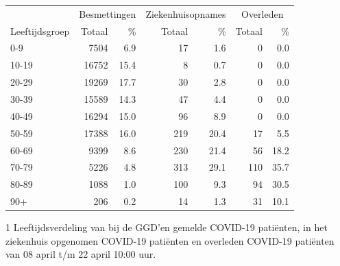 \documentclass[
  english,
  man,floatsintext]{apa6}
\begin{document}
\begin{table}
\centering\begingroup\fontsize{11}{13}\selectfont

\begin{threeparttable}
\begin{tabular}{lrrrrrr}
\toprule
\multicolumn{1}{c}{ } & \multicolumn{2}{c}{Besmettingen} & \multicolumn{2}{c}{Ziekenhuisopnames} & \multicolumn{2}{c}{Overleden} \\
\cmidrule(l{3pt}r{3pt}){2-3} \cmidrule(l{3pt}r{3pt}){4-5} \cmidrule(l{3pt}r{3pt}){6-7}
Leeftijdsgroep & Totaal & \% & Totaal & \% & Totaal & \%\\
\midrule
0-9 & 7504 & 6.9 & 17 & 1.6 & 0 & 0.0\\
10-19 & 16752 & 15.4 & 8 & 0.7 & 0 & 0.0\\
20-29 & 19269 & 17.7 & 30 & 2.8 & 0 & 0.0\\
30-39 & 15589 & 14.3 & 47 & 4.4 & 0 & 0.0\\
40-49 & 16294 & 15.0 & 96 & 8.9 & 0 & 0.0\\
50-59 & 17388 & 16.0 & 219 & 20.4 & 17 & 5.5\\
60-69 & 9399 & 8.6 & 230 & 21.4 & 56 & 18.2\\
70-79 & 5226 & 4.8 & 313 & 29.1 & 110 & 35.7\\
80-89 & 1088 & 1.0 & 100 & 9.3 & 94 & 30.5\\
90+ & 206 & 0.2 & 14 & 1.3 & 31 & 10.1\\
\bottomrule
\end{tabular}
\begin{tablenotes}
\item[1] Leeftijdsverdeling van bij de GGD’en gemelde COVID-19 patiënten, in het ziekenhuis opgenomen COVID-19 patiënten en overleden COVID-19 patiënten van 08 april t/m 22 april 10:00 uur.
\end{tablenotes}
\end{threeparttable}
\endgroup{}
\end{table}

\newpage
\end{document}
